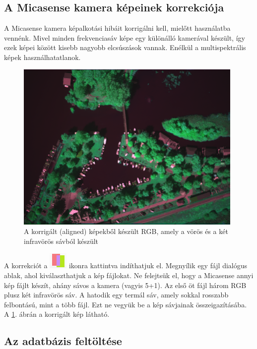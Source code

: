 \documentclass[a4paper,12pt]{article}
\begin{document}
\subsection{A Micasense kamera képeinek korrekciója}

A Micasense kamera képalkotási hibáit korrigálni kell, mielőtt használatba vennénk. Mivel minden frekvenciasáv képe egy különálló kamerával készült, így ezek képei között kisebb nagyobb elcsúszások vannak. Enélkül a multispektrális képek használhatatlanok.

\begin{figure}
	\centering
	\includegraphics[width=11cm]{mica_aligned}
	\caption{A korrigált (aligned) képekből készült RGB, amely a vörös és a két infravörös sávból készült}
	\label{fig:mica_aligned}
\end{figure}

A korrekciót a \includegraphics[width=0.5 cm]{aligner} ikonra kattintva indíthatjuk el. Megnyílik egy fájl dialógus ablak, ahol kiválaszthatjuk a kép fájlokat. Ne felejtsük el, hogy a Micasense annyi kép fájlt készít, ahány sávos a kamera (vagyis 5+1). Az első öt fájl három RGB plusz két infravörös sáv. A hatodik egy termál sáv, amely sokkal rosszabb felbontású, mint a több fájl. Ezt ne vegyük be a kép sávjainak összeigazításába. A \ref{fig:mica_aligned}. ábrán a korrigált kép látható.



\subsection{Az adatbázis feltöltése}
\end{document}
